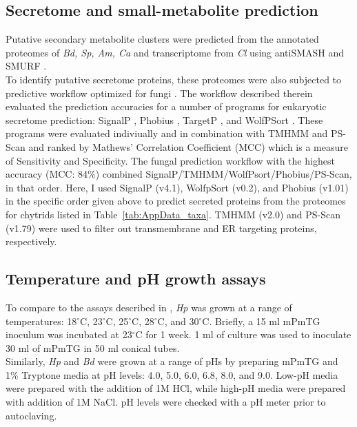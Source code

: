\subsection*{Secretome and small-metabolite prediction}
Putative secondary metabolite clusters were predicted from the annotated proteomes of \textit{Bd, Sp, Am, Ca}
and transcriptome from \textit{Cl} using antiSMASH \cite{Blin2013} and SMURF \cite{Khaldi2010}.\\
\indent To identify putative secretome proteins, these proteomes were also subjected to
predictive workflow optimized for fungi \cite{Min2010}. The workflow described therein
evaluated the prediction accuracies for a number of programs for eukaryotic secretome prediction:
SignalP \cite{Bendtsen2004}, Phobius \cite{Kall2004,Kall2007}, TargetP
\cite{Emanuelsson2000,Emanuelsson2007}, and WolfPSort \cite{Sprenger2006,Horton2007}.
These programs were evaluated indiviually and in combination with TMHMM \cite{Krogh2001} and PS-Scan
\cite{deCastro2006} and ranked by Mathews' Correlation Coefficient (MCC) \cite{Matthews1975,Baldi2000,Menne2000}
which is a measure of Sensitivity and Specificity. The fungal prediction workflow with
the highest accuracy (MCC: 84\%) combined SignalP/TMHMM/WolfPsort/Phobius/PS-Scan, in that order.
Here, I used SignalP (v4.1), WolfpSort (v0.2), and Phobius (v1.01) in the specific order given above to predict secreted proteins from
the proteomes for chytrids listed in Table~\ref{tab:AppData_taxa}. TMHMM (v2.0) and PS-Scan (v1.79) were
used to filter out transmembrane and ER targeting proteins, respectively.\\

\subsection*{Temperature and pH growth assays}
To compare to the assays described in \cite{Piotrowski2004}, \textit{Hp} was grown at a range of temperatures: 18$^{\circ}$C, 23$^{\circ}$C, 25$^{\circ}$C, 28$^{\circ}$C, and 30$^{\circ}$C. Briefly, a 15 ml mPmTG inoculum was incubated at 23$^{\circ}$C for 1 week. 1 ml of culture was used to inoculate 30 ml of mPmTG in 50 ml conical tubes. \\
\indent Similarly, \textit{Hp} and \textit{Bd} were grown at a range of pHs by preparing mPmTG and 1\% Tryptone media at pH levels: 4.0, 5.0, 6.0, 6.8, 8.0, and 9.0. Low-pH media were prepared with the addition of 1M HCl, while high-pH media were prepared with addition of 1M NaCl. pH levels were checked with a pH meter prior to autoclaving.\\

